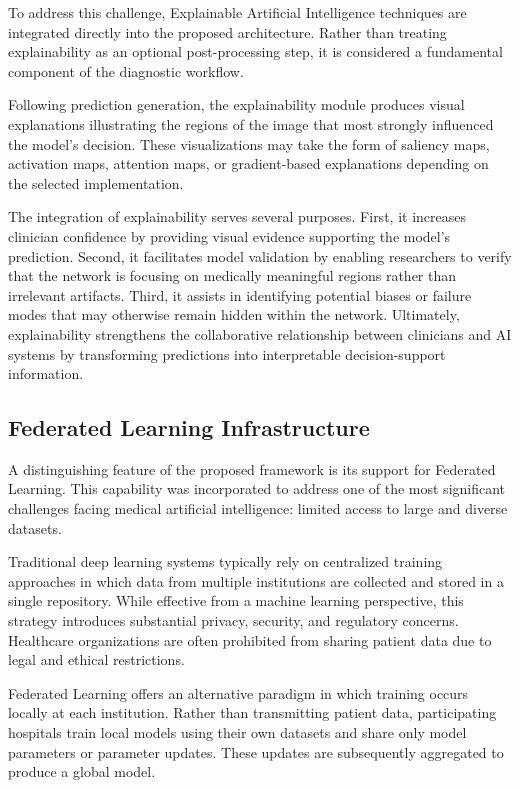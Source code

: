 To address this challenge, Explainable Artificial Intelligence techniques are integrated directly into the proposed architecture. Rather than treating explainability as an optional post-processing step, it is considered a fundamental component of the diagnostic workflow.

Following prediction generation, the explainability module produces visual explanations illustrating the regions of the image that most strongly influenced the model's decision. These visualizations may take the form of saliency maps, activation maps, attention maps, or gradient-based explanations depending on the selected implementation.

The integration of explainability serves several purposes. First, it increases clinician confidence by providing visual evidence supporting the model's prediction. Second, it facilitates model validation by enabling researchers to verify that the network is focusing on medically meaningful regions rather than irrelevant artifacts. Third, it assists in identifying potential biases or failure modes that may otherwise remain hidden within the network. Ultimately, explainability strengthens the collaborative relationship between clinicians and AI systems by transforming predictions into interpretable decision-support information.

\subsection{Federated Learning Infrastructure}

A distinguishing feature of the proposed framework is its support for Federated Learning. This capability was incorporated to address one of the most significant challenges facing medical artificial intelligence: limited access to large and diverse datasets.

Traditional deep learning systems typically rely on centralized training approaches in which data from multiple institutions are collected and stored in a single repository. While effective from a machine learning perspective, this strategy introduces substantial privacy, security, and regulatory concerns. Healthcare organizations are often prohibited from sharing patient data due to legal and ethical restrictions.

Federated Learning offers an alternative paradigm in which training occurs locally at each institution. Rather than transmitting patient data, participating hospitals train local models using their own datasets and share only model parameters or parameter updates. These updates are subsequently aggregated to produce a global model.

